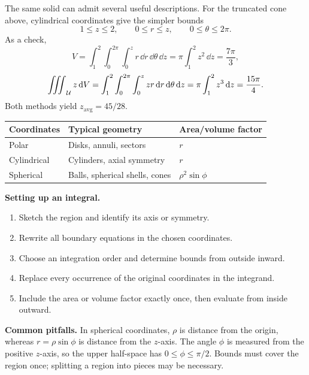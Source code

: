 The same solid can admit several useful descriptions. For the truncated cone above, cylindrical coordinates give the simpler bounds
\[
    1 \leq z \leq 2,\qquad 0 \leq r \leq z,\qquad
    0 \leq \theta \leq 2\pi.
\]
As a check,
\[
    V = \int_1^2\int_0^{2\pi}\int_0^z r\,\dd{r}\,\dd{\theta}\,\dd{z}
    = \pi\int_1^2 z^2\,\dd{z} = \frac{7\pi}{3},
\]
\[
    \mathop{\int\mkern-10mu\int\mkern-10mu\int}\nolimits_{\mathcal{U}} z \, \mathrm{d}V
    = \int_1^2\int_0^{2\pi}\int_0^z zr\,\mathrm{d}r\,\mathrm{d}\theta\,\mathrm{d}z
    = \pi\int_1^2 z^3\,\mathrm{d}z = \frac{15\pi}{4}.
\]
Both methods yield $z_{\mathrm{avg}} = 45/28$.

\begin{center}
\renewcommand{\arraystretch}{1.35}
\begin{tabular}{lll}
\hline
\textbf{Coordinates} & \textbf{Typical geometry} & \textbf{Area/volume factor}\\
\hline
Polar & Disks, annuli, sectors & $r$\\
Cylindrical & Cylinders, axial symmetry & $r$\\
Spherical & Balls, spherical shells, cones & $\rho^2\sin\phi$\\
\hline
\end{tabular}
\end{center}

\textbf{Setting up an integral.}
\begin{enumerate}
    \item Sketch the region and identify its axis or symmetry.
    \item Rewrite all boundary equations in the chosen coordinates.
    \item Choose an integration order and determine bounds from outside inward.
    \item Replace every occurrence of the original coordinates in the integrand.
    \item Include the area or volume factor exactly once, then evaluate from inside outward.
\end{enumerate}

\textbf{Common pitfalls.} In spherical coordinates, $\rho$ is distance from the origin, whereas $r = \rho\sin\phi$ is distance from the $z$-axis. The angle $\phi$ is measured from the positive $z$-axis, so the upper half-space has $0 \leq \phi \leq \pi/2$. Bounds must cover the region once; splitting a region into pieces may be necessary.
